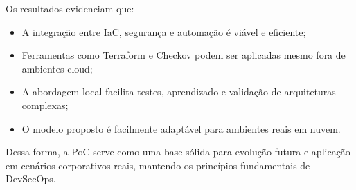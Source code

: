 Os resultados evidenciam que:

\begin{itemize}
\item A integração entre IaC, segurança e automação é viável e eficiente;
\item Ferramentas como Terraform e Checkov podem ser aplicadas mesmo fora de ambientes cloud;
\item A abordagem local facilita testes, aprendizado e validação de arquiteturas complexas;
\item O modelo proposto é facilmente adaptável para ambientes reais em nuvem.
\end{itemize}

Dessa forma, a PoC serve como uma base sólida para evolução futura e aplicação em cenários corporativos reais, mantendo os princípios fundamentais de DevSecOps.
